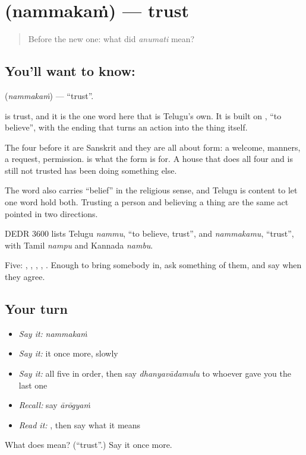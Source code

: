 \section[\texorpdfstring{\te{నమ్మకం} (nammakaṁ)}{నమ్మకం (nammakaṁ)}]{ (nammakaṁ) — trust}

\label{lesson:TE-C65-trust}



\begin{quote}
Before the new one: what did \emph{anumati} mean?
\end{quote}

\subsection*{You'll want to know: }
\textbf{} (\emph{nammakaṁ}) — \textquotedblleft{}trust\textquotedblright{}.

 is trust, and it is the one word here that is Telugu's own. It is built on , \textquotedblleft{}to believe\textquotedblright{}, with the ending that turns an action into the thing itself.

The four before it are Sanskrit and they are all about form: a welcome, manners, a request, permission.  is what the form is for. A house that does all four and is still not trusted has been doing something else.

The word also carries \textquotedblleft{}belief\textquotedblright{} in the religious sense, and Telugu is content to let one word hold both. Trusting a person and believing a thing are the same act pointed in two directions.

DEDR 3600 lists Telugu \emph{nammu}, \textquotedblleft{}to believe, trust\textquotedblright{}, and \emph{nammakamu}, \textquotedblleft{}trust\textquotedblright{}, with Tamil \emph{nampu} and Kannada \emph{nambu}.

\begin{grammarlens}[title={What you've built}]
Five: , , , , . Enough to bring somebody in, ask something of them, and say  when they agree.
\end{grammarlens}

\subsection*{Your turn}
\begin{itemize}
\raggedright
  \item \emph{Say it:} \emph{nammakaṁ}
  \item \emph{Say it:} it once more, slowly
  \item \emph{Say it:} all five in order, then say \emph{dhanyavādamulu} to whoever gave you the last one
  \item \emph{Recall:} say \emph{ārōgyaṁ}
  \item \emph{Read it:} \textbf{}, then say what it means
\end{itemize}

\begin{tcolorbox}[breakable,colback=teal!4,colframe=teal!35!black,title={Before you move on}]
What does  mean? (\textquotedblleft{}trust\textquotedblright{}.) Say it once more.
\end{tcolorbox}
